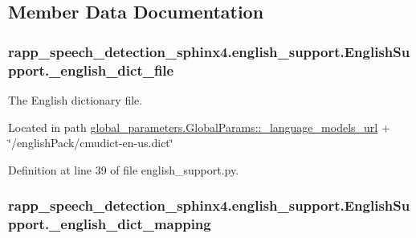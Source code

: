 \subsection{Member Data Documentation}
\hypertarget{classrapp__speech__detection__sphinx4_1_1english__support_1_1EnglishSupport_a82ada1f7e06781ca0bd75c41319433f3}{
\subsubsection[{\-\_\-english\-\_\-dict\-\_\-file}]{\setlength{\rightskip}{0pt plus 5cm}rapp\-\_\-speech\-\_\-detection\-\_\-sphinx4.\-english\-\_\-support.\-English\-Support.\-\_\-english\-\_\-dict\-\_\-file\hspace{0.3cm}{\ttfamily [private]}}}\label{classrapp__speech__detection__sphinx4_1_1english__support_1_1EnglishSupport_a82ada1f7e06781ca0bd75c41319433f3}


The English dictionary file. 

Located in path \hyperlink{classrapp__speech__detection__sphinx4_1_1global__parameters_1_1GlobalParams_a669e25ce189ad6cae67f52ebeb3404c7}{global\-\_\-parameters.\-Global\-Params\-::\-\_\-language\-\_\-models\-\_\-url} + \char`\"{}/english\-Pack/cmudict-\/en-\/us.\-dict\char`\"{} 

Definition at line 39 of file english\-\_\-support.\-py.

\hypertarget{classrapp__speech__detection__sphinx4_1_1english__support_1_1EnglishSupport_adaabe1ce40092eef99be9c2eec178f8d}{
\subsubsection[{\-\_\-english\-\_\-dict\-\_\-mapping}]{\setlength{\rightskip}{0pt plus 5cm}rapp\-\_\-speech\-\_\-detection\-\_\-sphinx4.\-english\-\_\-support.\-English\-Support.\-\_\-english\-\_\-dict\-\_\-mapping\hspace{0.3cm}{\ttfamily [private]}}}\label{classrapp__speech__detection__sphinx4_1_1english__support_1_1EnglishSupport_adaabe1ce40092eef99be9c2eec178f8d}



